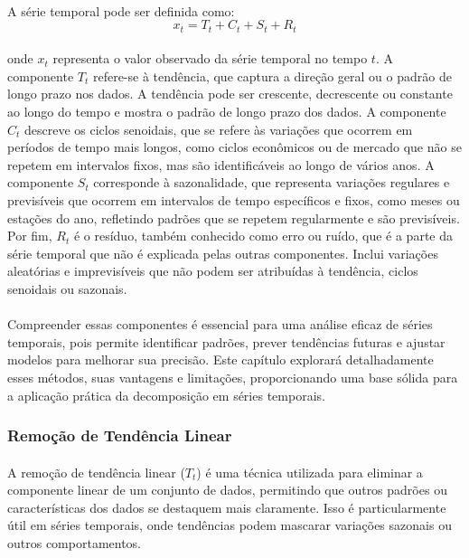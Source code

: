 \paragraph{} A série temporal pode ser definida como:
\begin{equation}
	x_t = T_t + C_t + S_t + R_t
\end{equation}

\paragraph{} onde \( x_t \) representa o valor observado da série temporal no tempo \( t \). A componente \( T_t \) refere-se à tendência, que captura a direção geral ou o padrão de longo prazo nos dados. A tendência pode ser crescente, decrescente ou constante ao longo do tempo e mostra o padrão de longo prazo dos dados. A componente \( C_t \) descreve os ciclos senoidais, que se refere às variações que ocorrem em períodos de tempo mais longos, como ciclos econômicos ou de mercado que não se repetem em intervalos fixos, mas são identificáveis ao longo de vários anos. A componente \( S_t \) corresponde à sazonalidade, que representa variações regulares e previsíveis que ocorrem em intervalos de tempo específicos e fixos, como meses ou estações do ano, refletindo padrões que se repetem regularmente e são previsíveis. Por fim, \( R_t \) é o resíduo, também conhecido como erro ou ruído, que é a parte da série temporal que não é explicada pelas outras componentes. Inclui variações aleatórias e imprevisíveis que não podem ser atribuídas à tendência, ciclos senoidais ou sazonais.

\paragraph{} Compreender essas componentes é essencial para uma análise eficaz de séries temporais, pois permite identificar padrões, prever tendências futuras e ajustar modelos para melhorar sua precisão. Este capítulo explorará detalhadamente esses métodos, suas vantagens e limitações, proporcionando uma base sólida para a aplicação prática da decomposição em séries temporais.

\subsubsection{Remoção de Tendência Linear}
\paragraph{} A remoção de tendência linear (\(T_t\)) é uma técnica utilizada para eliminar a componente linear de um conjunto de dados, permitindo que outros padrões ou características dos dados se destaquem mais claramente. Isso é particularmente útil em séries temporais, onde tendências podem mascarar variações sazonais ou outros comportamentos.
